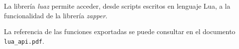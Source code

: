 La librería \emph{luaz} permite acceder, desde scripts escritos en lenguaje Lua, a la funcionalidad de la librería \emph{zapper}.

La referencia de las funciones exportadas se puede consultar en el documento \texttt{lua\_api.pdf}.